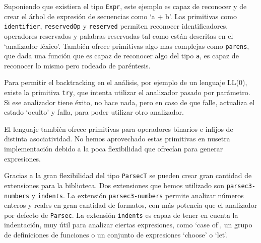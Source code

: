 \documentclass[class=article, crop=false]{standalone}
\begin{document}
Suponiendo que existiera el tipo \verb`Expr`, este ejemplo es capaz de reconocer y de crear
el árbol de expresión de secuencias como `a + b'. Las primitivas como \verb`identifier`,
\verb`reservedOp` y \verb`reserved` permiten reconocer identificadores, operadores reservados
y palabras reservadas tal como están descritas en el `analizador léxico'. También ofrece
primitivas algo mas complejas como \verb`parens`, que dada una función que es capaz de
reconocer algo del tipo \verb`a`, es capaz de reconocer lo mismo pero rodeado de paréntesis.

Para permitir el backtracking en el análisis, por ejemplo de un lenguaje LL(0), existe la
primitiva \verb`try`, que intenta utilizar el analizador pasado por parámetro. Si ese
analizador tiene éxito, no hace nada, pero en caso de que falle, actualiza el estado `oculto'
y falla, para poder utilizar otro analizador.

El lenguaje también ofrece primitivas para operadores binarios e infijos de distinta
asociatividad. No hemos aprovechado estas primitivas en nusetra implementación debido a la
poca flexibilidad que ofrecían para generar expresiones.

Gracias a la gran flexibilidad del tipo \verb`ParsecT` se pueden crear gran cantidad de
extensiones para la biblioteca. Dos extensiones que hemos utilizado son \verb`parsec3-numbers`
y \verb`indents`. La extensión \verb`parsec3-numbers` permite analizar números enteros y
reales en gran cantidad de formatos, con más potencia que el analizador por defecto de
\verb`Parsec`. La extensión \verb`indents` es capaz de tener en cuenta la indentación, muy
útil para analizar ciertas expresiones, como `case of', un grupo de definiciones de funciones
o un conjunto de expresiones `choose' o `let'.
\end{document}

